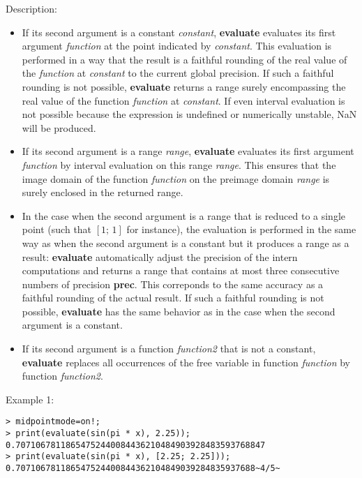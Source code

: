 \noindent Description: \begin{itemize}

\item If its second argument is a constant \emph{constant}, \textbf{evaluate} evaluates
   its first argument \emph{function} at the point indicated by
   \emph{constant}. This evaluation is performed in a way that the result is a
   faithful rounding of the real value of the \emph{function} at \emph{constant} to
   the current global precision. If such a faithful rounding is not
   possible, \textbf{evaluate} returns a range surely encompassing the real value
   of the function \emph{function} at \emph{constant}. If even interval evaluation
   is not possible because the expression is undefined or numerically
   unstable, NaN will be produced.

\item If its second argument is a range \emph{range}, \textbf{evaluate} evaluates its
   first argument \emph{function} by interval evaluation on this range
   \emph{range}. This ensures that the image domain of the function \emph{function}
   on the preimage domain \emph{range} is surely enclosed in the returned
   range.

\item In the case when the second argument is a range that is reduced to a
   single point (such that $[1;\,1]$ for instance), the evaluation
   is performed in the same way as when the second argument is a constant but
   it produces a range as a result: \textbf{evaluate} automatically adjust the precision
   of the intern computations and returns a range that contains at most three
   consecutive numbers of precision \textbf{prec}. This correponds to the same accuracy
   as a faithful rounding of the actual result. If such a faithful rounding
   is not possible, \textbf{evaluate} has the same behavior as in the case when the
   second argument is a constant.

\item If its second argument is a function \emph{function2} that is not a
   constant, \textbf{evaluate} replaces all occurrences of the free variable in
   function \emph{function} by function \emph{function2}.
\end{itemize}
\noindent Example 1: 
\begin{center}\begin{minipage}{15cm}\begin{Verbatim}[frame=single]
> midpointmode=on!;
> print(evaluate(sin(pi * x), 2.25));
0.70710678118654752440084436210484903928483593768847
> print(evaluate(sin(pi * x), [2.25; 2.25]));
0.707106781186547524400844362104849039284835937688~4/5~
\end{Verbatim}
\end{minipage}\end{center}
